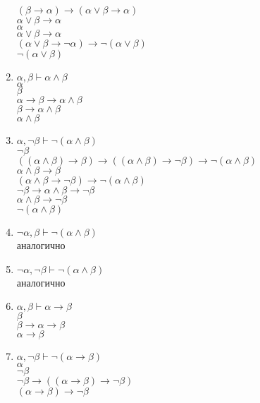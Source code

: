\begin{enumerate}
$(\beta \to \alpha) \to (\alpha \lor \beta \to \alpha)$ \\
$\alpha \lor \beta \to \alpha$ \\
$\alpha$ \\
$\alpha \lor \beta \to \alpha$ \\
$(\alpha \lor \beta \to \lnot \alpha) \to \lnot (\alpha \lor \beta)$ \\
$\lnot (\alpha \lor \beta)$
\item $\alpha, \beta \vdash \alpha \land \beta$ \\
$\alpha$ \\
$\beta$ \\
$\alpha \to \beta \to \alpha \land \beta$ \\
$\beta \to \alpha \land \beta$ \\
$\alpha \land \beta$
\item $\alpha, \lnot \beta \vdash \lnot (\alpha \land \beta)$ \\
$\lnot \beta$ \\
$((\alpha \land \beta) \to \beta) \to ((\alpha \land \beta) \to \lnot \beta) \to \lnot (\alpha \land \beta)$ \\
$\alpha \land \beta \to \beta$ \\
$(\alpha \land \beta \to \lnot \beta) \to \lnot (\alpha \land \beta)$ \\
$\lnot \beta \to \alpha \land \beta \to \lnot \beta$ \\
$\alpha \land \beta \to \lnot \beta$ \\
$\lnot (\alpha \land \beta)$
\item $\lnot \alpha, \beta \vdash \lnot (\alpha \land \beta)$ \\
аналогично
\item $\lnot \alpha, \lnot \beta \vdash \lnot (\alpha \land \beta)$ \\
аналогично
\item $\alpha, \beta \vdash \alpha \to \beta$ \\
$\beta$ \\
$\beta \to \alpha \to \beta$ \\
$\alpha \to \beta$
\item $\alpha, \lnot \beta \vdash \lnot (\alpha \to \beta)$ \\
$\alpha$ \\
$\lnot \beta$ \\
$\lnot \beta \to ((\alpha \to \beta) \to \lnot \beta)$ \\
$(\alpha \to \beta) \to \lnot \beta$ \\

\end{enumerate}
